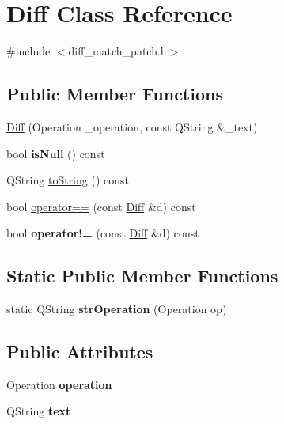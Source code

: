\hypertarget{class_diff}{}\section{Diff Class Reference}
\label{class_diff}


{\ttfamily \#include $<$diff\+\_\+match\+\_\+patch.\+h$>$}

\subsection*{Public Member Functions}
\begin{DoxyCompactItemize}
\item 
\hyperlink{class_diff_a8fafc882c451d2b3768b0637aa0fe6b6}{Diff} (Operation \+\_\+operation, const Q\+String \&\+\_\+text)
\item 
\mbox{\label{class_diff_aa7cd0ff9ec5916394f67e3a518cb543b}} 
bool {\bfseries is\+Null} () const
\item 
Q\+String \hyperlink{class_diff_aeb7f4b886cc284169435173d53e71a0c}{to\+String} () const
\item 
bool \hyperlink{class_diff_a455a13550ef216f239c9195edec50b40}{operator==} (const \hyperlink{class_diff}{Diff} \&d) const
\item 
\mbox{\label{class_diff_a09ec8344d9f166cf2acf150754849a46}} 
bool {\bfseries operator!=} (const \hyperlink{class_diff}{Diff} \&d) const
\end{DoxyCompactItemize}
\subsection*{Static Public Member Functions}
\begin{DoxyCompactItemize}
\item 
\mbox{\label{class_diff_a922600ec44c726ba32675b33e0c52ac6}} 
static Q\+String {\bfseries str\+Operation} (Operation op)
\end{DoxyCompactItemize}
\subsection*{Public Attributes}
\begin{DoxyCompactItemize}
\item 
\mbox{\label{class_diff_a134b63b7f79fbb3596a42bb7b2a5140e}} 
Operation {\bfseries operation}
\item 
\mbox{\label{class_diff_a5aab41a87ff74a0f572962ede20d9f2d}} 
Q\+String {\bfseries text}
\end{DoxyCompactItemize}


